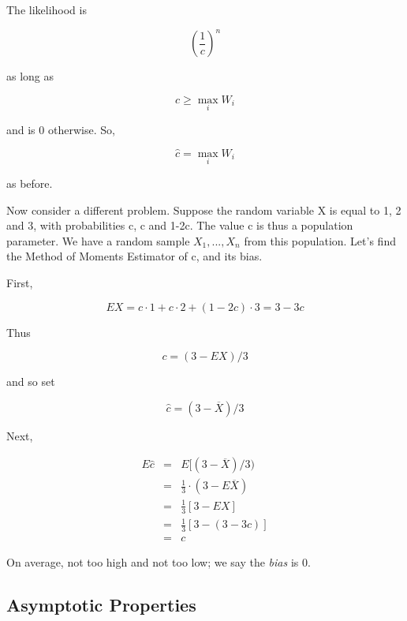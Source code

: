 The likelihood is

\begin{equation}
\left ( \frac{1}{c} \right )^n
\end{equation}

as long as

\begin{equation}
c \geq \max_i W_i
\end{equation}

and is 0 otherwise.  So,

\begin{equation}
\label{unifmle}
\widehat{c} = \max_i W_i
\end{equation}

as before.

Now consider a different problem.  Suppose the random variable X is
equal to 1, 2 and 3, with probabilities c, c and 1-2c.  The value c is
thus a population parameter.  We have a random sample $X_1,...,X_n$ from
this population.  Let's find the Method of Moments Estimator of c, and
its bias.

First,

\begin{equation}
EX = c \cdot 1 + c \cdot 2 + (1-2c) \cdot 3 = 3 - 3c
\end{equation}

Thus 

\begin{equation}
c = (3-EX)/3
\end{equation}

and so set

\begin{equation}
\hat{c} = (3-\overline{X})/3
\end{equation}

Next,

\begin{eqnarray}
E \hat{c} &=& E[(3-\overline{X})/3) \\ 
&=& \frac{1}{3} \cdot (3 - E\overline{X}) \\
&=& \frac{1}{3} [ 3 - EX ] \\
&=& \frac{1}{3} [ 3 - (3-3c) ] \\
&=& c
\end{eqnarray}

On average, not too high and not too low; we say the {\it bias} is 0.

\subsection{Asymptotic Properties}

